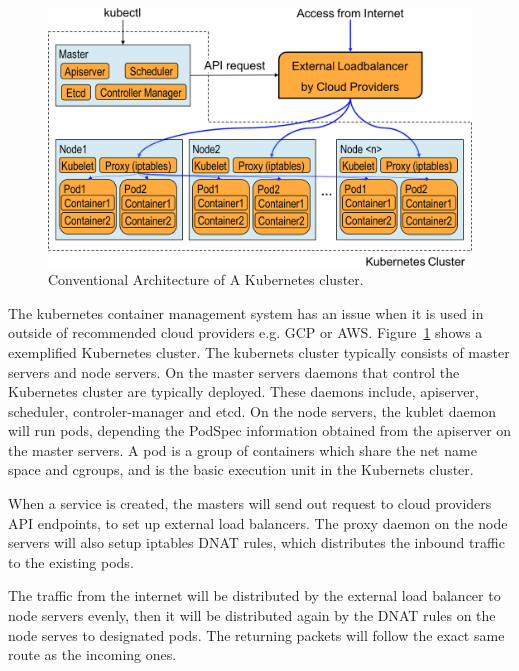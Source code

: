 \begin{figure}
\includegraphics[width=\columnwidth]{Figs/K8sConventional}
\caption{Conventional Architecture of A Kubernetes cluster.}
\label{fig:K8sConventional}
\end{figure}

The kubernetes container management system has an issue when it is used in outside of recommended cloud providers e.g. GCP or AWS.
Figure~\ref{fig:K8sConventional} shows a exemplified Kubernetes cluster.
The kubernets cluster typically consists of master servers and node servers.
On the master servers daemons that control the Kubernetes cluster are typically deployed. 
These daemons include, apiserver, scheduler, controler-manager and etcd. 
On the node servers, the kublet daemon will run pods, depending the PodSpec information obtained from the apiserver on the master servers.
A pod is a group of containers which share the net name space and cgroups, and is the basic execution unit in the Kubernets cluster.

When a service is created, the masters will send out request to cloud providers API endpoints, to set up external load balancers.
The proxy daemon on the node servers will also setup iptables DNAT\cite{MartinA.Brown2017} rules, 
which distributes the inbound traffic to the existing pods.

The traffic from the internet will be distributed by the external load balancer to node servers evenly, 
then it will be distributed again by the DNAT rules on the node serves to designated pods. 
The returning packets will follow the exact same route as the incoming ones.

